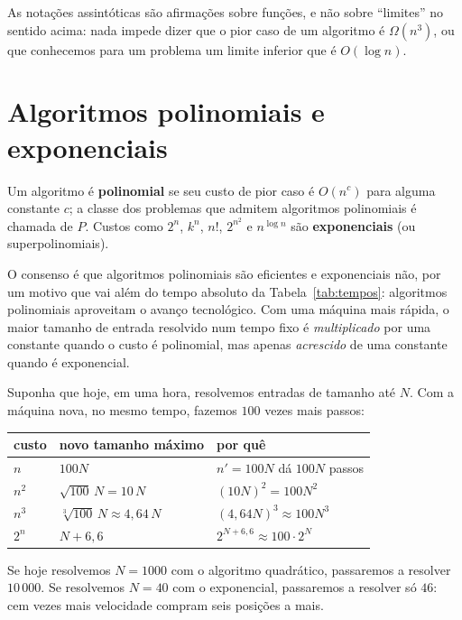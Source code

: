 As notações assintóticas são afirmações sobre funções, e não sobre ``limites'' no sentido acima: nada impede dizer que o pior caso de um algoritmo é $\Omega(n^3)$, ou que conhecemos para um problema um limite inferior que é $O(\log n)$.

\section{Algoritmos polinomiais e exponenciais}\label{sec:polinomiais}
Um algoritmo é \textbf{polinomial} se seu custo de pior caso é $O(n^c)$ para alguma constante $c$; a classe dos problemas que admitem algoritmos polinomiais é chamada de $P$. Custos como $2^n$, $k^n$, $n!$, $2^{n^2}$ e $n^{\log n}$ são \textbf{exponenciais} (ou superpolinomiais).

O consenso é que algoritmos polinomiais são eficientes e exponenciais não, por um motivo que vai além do tempo absoluto da Tabela~\ref{tab:tempos}: algoritmos polinomiais aproveitam o avanço tecnológico. Com uma máquina mais rápida, o maior tamanho de entrada resolvido num tempo fixo é \emph{multiplicado} por uma constante quando o custo é polinomial, mas apenas \emph{acrescido} de uma constante quando é exponencial.

\begin{exemplo}\label{ex:maquina}
Suponha que hoje, em uma hora, resolvemos entradas de tamanho até $N$. Com a máquina nova, no mesmo tempo, fazemos $100$ vezes mais passos:
\begin{center}\small
\begin{tabular}{@{}lll@{}}
\toprule
custo & novo tamanho máximo & por quê\\
\midrule
$n$ & $100N$ & $n'=100N$ dá $100N$ passos\\
$n^2$ & $\sqrt{100}\,N=10\,N$ & $(10N)^2=100N^2$\\
$n^3$ & $\sqrt[3]{100}\,N\approx4{,}64\,N$ & $(4{,}64N)^3\approx100N^3$\\
$2^n$ & $N+6{,}6$ & $2^{N+6{,}6}\approx100\cdot2^N$\\
\bottomrule
\end{tabular}
\end{center}
Se hoje resolvemos $N=1000$ com o algoritmo quadrático, passaremos a resolver $10\,000$. Se resolvemos $N=40$ com o exponencial, passaremos a resolver só $46$: cem vezes mais velocidade compram seis posições a mais.
\end{exemplo}

